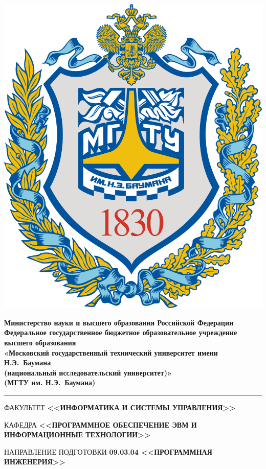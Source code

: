\documentclass[a4paper]{article}
\begin{document}
	\noindent
	\begin{minipage}{0.15\linewidth}
		\includegraphics[width=\linewidth]{b_logo}
	\end{minipage}
	\noindent
	\begin{minipage}{0.85\linewidth}\centering
		\bf{Министерство науки и высшего образования Российской Федерации}\\
		\bf{Федеральное государственное бюджетное образовательное учреждение высшего образования}\\
		\bf{«Московский государственный технический университет имени Н.Э.~Баумана}\\
		\bf{(национальный исследовательский университет)»}\\
		\bf{(МГТУ им. Н.Э.~Баумана)}
	\end{minipage}
	\newline
	\newline
	\noindent\rule{\textwidth}{3pt}
	\newline
	
	\noindent
	ФАКУЛЬТЕТ {\bf <<ИНФОРМАТИКА И СИСТЕМЫ УПРАВЛЕНИЯ>>}
	
	\noindent\newline
	КАФЕДРА {\bf<<ПРОГРАММНОЕ ОБЕСПЕЧЕНИЕ ЭВМ И ИНФОРМАЦИОННЫЕ ТЕХНОЛОГИИ>>}
	
	\noindent\newline
	НАПРАВЛЕНИЕ ПОДГОТОВКИ {\bf 09.03.04 <<ПРОГРАММНАЯ ИНЖЕНЕРИЯ>>}
\end{document}
